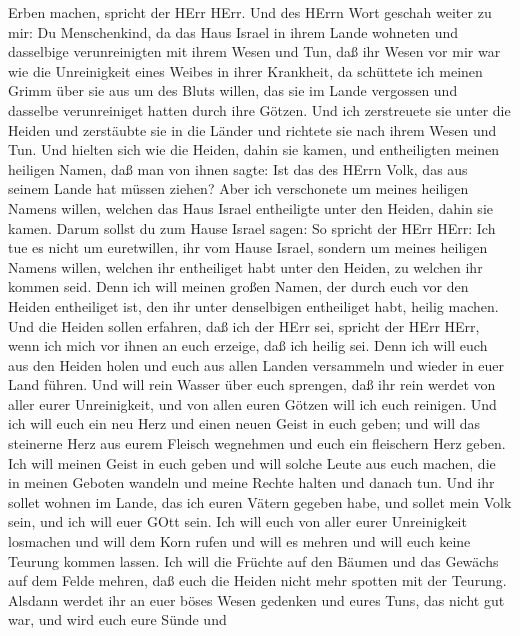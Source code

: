 Erben machen, spricht der HErr HErr.  Und des HErrn Wort
geschah weiter zu mir:  Du Menschenkind, da das Haus Israel
in ihrem Lande wohneten und dasselbige verunreinigten mit ihrem Wesen
und Tun, daß ihr Wesen vor mir war wie die Unreinigkeit eines Weibes in
ihrer Krankheit,  da schüttete ich meinen Grimm über sie
aus um des Bluts willen, das sie im Lande vergossen und dasselbe
verunreiniget hatten durch ihre Götzen.  Und ich
zerstreuete sie unter die Heiden und zerstäubte sie in die Länder und
richtete sie nach ihrem Wesen und Tun.  Und hielten sich
wie die Heiden, dahin sie kamen, und entheiligten meinen heiligen Namen,
daß man von ihnen sagte: Ist das des HErrn Volk, das aus seinem Lande
hat müssen ziehen?  Aber ich verschonete um meines heiligen
Namens willen, welchen das Haus Israel entheiligte unter den Heiden,
dahin sie kamen.  Darum sollst du zum Hause Israel sagen:
So spricht der HErr HErr: Ich tue es nicht um euretwillen, ihr vom Hause
Israel, sondern um meines heiligen Namens willen, welchen ihr
entheiliget habt unter den Heiden, zu welchen ihr kommen seid.
 Denn ich will meinen großen Namen, der durch euch vor den
Heiden entheiliget ist, den ihr unter denselbigen entheiliget habt,
heilig machen. Und die Heiden sollen erfahren, daß ich der HErr sei,
spricht der HErr HErr, wenn ich mich vor ihnen an euch erzeige, daß ich
heilig sei.  Denn ich will euch aus den Heiden holen und
euch aus allen Landen versammeln und wieder in euer Land führen.
 Und will rein Wasser über euch sprengen, daß ihr rein
werdet von aller eurer Unreinigkeit, und von allen euren Götzen will ich
euch reinigen.  Und ich will euch ein neu Herz und einen
neuen Geist in euch geben; und will das steinerne Herz aus eurem Fleisch
wegnehmen und euch ein fleischern Herz geben.  Ich will
meinen Geist in euch geben und will solche Leute aus euch machen, die in
meinen Geboten wandeln und meine Rechte halten und danach tun.
 Und ihr sollet wohnen im Lande, das ich euren Vätern
gegeben habe, und sollet mein Volk sein, und ich will euer GOtt sein.
 Ich will euch von aller eurer Unreinigkeit losmachen und
will dem Korn rufen und will es mehren und will euch keine Teurung
kommen lassen.  Ich will die Früchte auf den Bäumen und das
Gewächs auf dem Felde mehren, daß euch die Heiden nicht mehr spotten mit
der Teurung.  Alsdann werdet ihr an euer böses Wesen
gedenken und eures Tuns, das nicht gut war, und wird euch eure Sünde und
